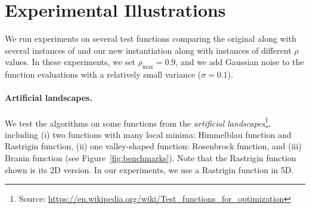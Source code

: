 \section{Experimental Illustrations}\label{sec:gpo.experiments}

We run experiments on several test functions comparing the original \POO along with several instances of \HOO and our new instantiation \PCT along with \HCT instances of different $\rho$ values. In these experiments, we set $\rho_{\max} = 0.9$, and we add Gaussian noise to the function evaluations with a relatively small variance ($\sigma=0.1$).

\paragraph{Artificial landscapes.}
We test the algorithms on some functions from the \emph{artificial landscapes}\footnote{Source: \url{https://en.wikipedia.org/wiki/Test_functions_for_optimization}}, including (i) two functions with many local minima: Himmelblau function and Rastrigin function, (ii) one valley-shaped function: Rosenbrock function, and (iii) Branin function (see Figure~\ref{fig:benchmarks}). Note that the Rastrigin function shown is its 2D version. In our experiments, we use a Rastrigin function in 5D.

